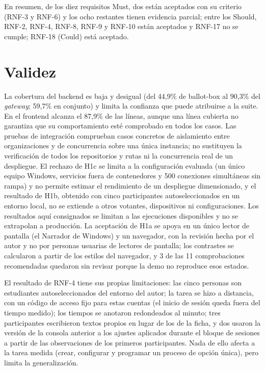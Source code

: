 En resumen, de los diez requisitos Must, dos están aceptados con su criterio
(RNF-3 y RNF-6) y los ocho restantes tienen evidencia parcial; entre los Should,
RNF-2, RNF-4, RNF-8, RNF-9 y RNF-10 están aceptados y RNF-17 no se cumple; RNF-18 (Could) está aceptado.

\section{Validez}
La cobertura del backend es baja y desigual (del 44,9\% de ballot-box al
90,3\% del \emph{gateway}; 59,7\% en conjunto) y limita la confianza que
puede atribuirse a la suite. En el frontend alcanza el 87,9\% de las líneas,
aunque una línea cubierta no garantiza que su comportamiento esté comprobado en
todos los casos. Las pruebas de
integración comprueban casos concretos de aislamiento entre organizaciones y
de concurrencia sobre una única instancia; no sustituyen la verificación de
todos los repositorios y rutas ni la concurrencia real de un despliegue. El rechazo de H1c se limita a la configuración
evaluada (un único equipo Windows, servicios fuera de contenedores y 500
conexiones simultáneas sin rampa) y no permite estimar el rendimiento de un
despliegue dimensionado, y el resultado de H1b, obtenido con cinco participantes
autoseleccionados en un entorno local, no se extiende a otros votantes,
dispositivos ni configuraciones. Los resultados aquí consignados se
limitan a las ejecuciones disponibles y no se extrapolan a producción.
La aceptación de H1a se apoya en un único lector de pantalla (el Narrador
de Windows) y un navegador, con la revisión hecha por el autor y no por
personas usuarias de lectores de pantalla; los contrastes se calcularon a
partir de los estilos del navegador, y 3 de las 11 comprobaciones
recomendadas quedaron sin revisar porque la demo no reproduce esos estados.

El resultado de RNF-4 tiene sus propias limitaciones: las cinco personas son
estudiantes autoseleccionados del entorno del autor; la tarea se hizo a
distancia, con un código de acceso fijo para estas cuentas (el inicio de
sesión queda fuera del tiempo medido); los tiempos se anotaron redondeados al
minuto; tres participantes escribieron textos propios en lugar de los de la
ficha, y dos usaron la versión de la consola anterior a los ajustes aplicados
durante el bloque de sesiones a partir de las observaciones de los primeros
participantes. Nada de ello afecta a la tarea medida (crear, configurar y
programar un proceso de opción única), pero limita la generalización.
